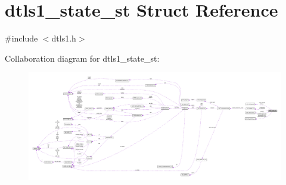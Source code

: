 \hypertarget{structdtls1__state__st}{}\section{dtls1\+\_\+state\+\_\+st Struct Reference}
\label{structdtls1__state__st}


{\ttfamily \#include $<$dtls1.\+h$>$}



Collaboration diagram for dtls1\+\_\+state\+\_\+st\+:
\nopagebreak
\begin{figure}[H]
\begin{center}
\leavevmode
\includegraphics[width=350pt]{structdtls1__state__st__coll__graph}
\end{center}
\end{figure}
